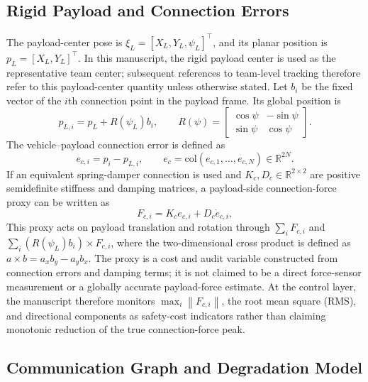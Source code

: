 \documentclass[letterpaper,journal]{IEEEtran}
\newcommand{\R}{\mathbb{R}}
\newcommand{\norm}[1]{\left\lVert #1 \right\rVert}
\begin{document}
\subsection{Rigid Payload and Connection Errors}

The payload-center pose is $\xi_L=[X_L,Y_L,\psi_L]^\top$, and its planar position is $p_L=[X_L,Y_L]^\top$. In this manuscript, the rigid payload center is used as the representative team center; subsequent references to team-level tracking therefore refer to this payload-center quantity unless otherwise stated. Let $b_i$ be the fixed vector of the $i$th connection point in the payload frame. Its global position is
\begin{equation}
p_{L,i}=p_L+R(\psi_L)b_i,\qquad
R(\psi)=\begin{bmatrix}\cos\psi&-\sin\psi\\ \sin\psi&\cos\psi\end{bmatrix}.
\label{eq:payload_anchor}
\end{equation}
The vehicle--payload connection error is defined as
\begin{equation}
e_{c,i}=p_i-p_{L,i},\qquad
e_c=\mathrm{col}(e_{c,1},\ldots,e_{c,N})\in\R^{2N}.
\label{eq:connection_error}
\end{equation}
If an equivalent spring-damper connection is used and $K_c,D_c\in\R^{2\times2}$ are positive semidefinite stiffness and damping matrices, a payload-side connection-force proxy can be written as
\begin{equation}
F_{c,i}=K_c e_{c,i}+D_c\dot e_{c,i},
\label{eq:connection_force}
\end{equation}
This proxy acts on payload translation and rotation through $\sum_i F_{c,i}$ and $\sum_i (R(\psi_L)b_i)\times F_{c,i}$, where the two-dimensional cross product is defined as $a\times b=a_xb_y-a_yb_x$. The proxy is a cost and audit variable constructed from connection errors and damping terms; it is not claimed to be a direct force-sensor measurement or a globally accurate payload-force estimate. At the control layer, the manuscript therefore monitors $\max_i\norm{F_{c,i}}$, the root mean square (RMS), and directional components as safety-cost indicators rather than claiming monotonic reduction of the true connection-force peak.

\subsection{Communication Graph and Degradation Model}
\end{document}

